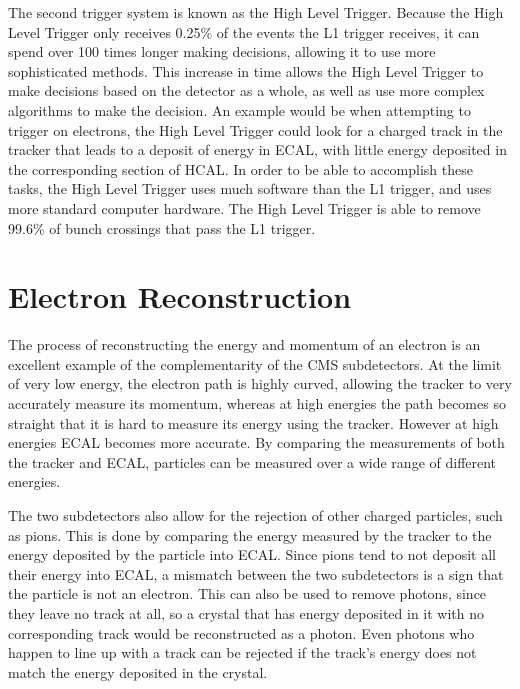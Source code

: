 The second trigger system is known as the High Level Trigger. Because the High Level Trigger only receives 0.25\% of the events the L1 trigger receives, it can spend over 100 times longer making decisions, allowing it to use  more sophisticated methods. This increase in time allows the High Level Trigger to make decisions based on the detector as a whole, as well as use more complex algorithms to make the decision. An example would be when attempting to trigger on electrons, the High Level Trigger could look for a charged track in the tracker that leads to a deposit of energy in ECAL, with little energy deposited in the corresponding section of HCAL. In order to be able to accomplish these tasks, the High Level Trigger uses much software than the L1 trigger, and uses more standard computer hardware. The High Level Trigger is able to remove 99.6\% of bunch crossings that pass the L1 trigger. 





\section{Electron Reconstruction} 
The process of reconstructing the energy and momentum of an electron is an excellent example of the complementarity of the CMS subdetectors. At the limit of very low energy, the electron path is highly curved, allowing the tracker to very accurately measure its momentum, whereas at high energies the path becomes so straight that it is hard to measure its energy using the tracker. However at high energies ECAL becomes more accurate. By comparing the measurements of both the tracker and ECAL, particles can be measured over a wide range of different energies.

The two subdetectors also allow for the rejection of other charged particles, such as pions. This is done by comparing the energy measured by the tracker to the energy deposited by the particle into ECAL. Since pions tend to not deposit all their energy into ECAL, a mismatch between the two subdetectors is a sign that the particle is not an electron. This can also be used to remove photons, since they leave no track at all, so a crystal that has energy deposited in it with no corresponding track would be reconstructed as a photon. Even photons who happen to line up with a track can be rejected if the track's energy does not match the energy deposited in the crystal.

